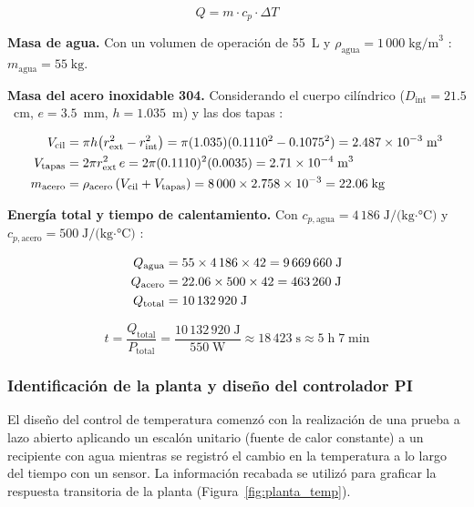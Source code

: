 \begin{equation}
  Q = m \cdot c_p \cdot \Delta T
  \label{eq:calor_sensible}
\end{equation}

\noindent\textbf{Masa de agua.} Con un volumen de operación de 55~L y
$\rho_\text{agua} = 1\,000\;\text{kg/m}^3$ \cite{Cengel2015}:
$m_\text{agua} = 55\;\text{kg}$.

\noindent\textbf{Masa del acero inoxidable 304.} Considerando el cuerpo
cilíndrico ($D_\text{int} = 21.5$~cm, $e = 3.5$~mm, $h = 1.035$~m) y las dos
tapas \cite{Cengel2015}:

\begin{align}
  V_\text{cil}  &= \pi h \!\left(r_\text{ext}^2 - r_\text{int}^2\right)
                 = \pi (1.035)(0.1110^2 - 0.1075^2) = 2.487 \times 10^{-3}\;\text{m}^3 \notag \\
  V_\text{tapas}&= 2\pi r_\text{ext}^2\, e
                 = 2\pi (0.1110)^2(0.0035) = 2.71 \times 10^{-4}\;\text{m}^3 \notag \\
  m_\text{acero}&= \rho_\text{acero}\,(V_\text{cil}+V_\text{tapas})
                 = 8\,000 \times 2.758 \times 10^{-3} = 22.06\;\text{kg}
\end{align}

\noindent\textbf{Energía total y tiempo de calentamiento.}
Con $c_{p,\text{agua}} = 4\,186\;\text{J/(kg·°C)}$ y
$c_{p,\text{acero}} = 500\;\text{J/(kg·°C)}$ \cite{Cengel2015}:

\begin{align}
  Q_\text{agua}  &= 55 \times 4\,186 \times 42 = 9\,669\,660\;\text{J} \notag \\
  Q_\text{acero} &= 22.06 \times 500 \times 42 = 463\,260\;\text{J} \notag \\
  Q_\text{total} &= 10\,132\,920\;\text{J}
\end{align}

\begin{equation}
  t = \frac{Q_\text{total}}{P_\text{total}} =
      \frac{10\,132\,920\;\text{J}}{550\;\text{W}} \approx 18\,423\;\text{s}
      \approx 5\;\text{h}\;7\;\text{min}
\end{equation}

\subsubsection*{Identificación de la planta y diseño del controlador PI}

El diseño del control de temperatura comenzó con la realización de una prueba a
lazo abierto aplicando un escalón unitario (fuente de calor constante) a un
recipiente con agua mientras se registró el cambio en la temperatura a lo largo del
tiempo con un sensor. La información recabada se utilizó para graficar la respuesta
transitoria de la planta (Figura~\ref{fig:planta_temp}).

